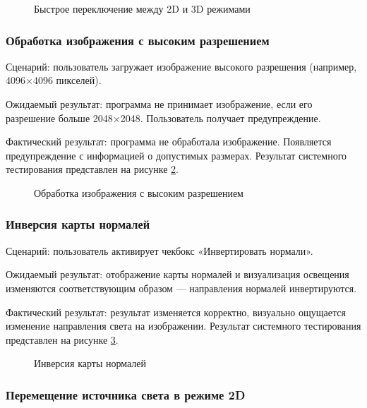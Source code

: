 \begin{figure}[H]
	\caption{Быстрое переключение между 2D и 3D режимами}
	\label{testswap:image}
\end{figure}

\subsubsection{Обработка изображения с высоким разрешением}

Сценарий: пользователь загружает изображение высокого разрешения (например, 4096×4096 пикселей).

Ожидаемый результат: программа не принимает изображение, если его разрешение больше 2048×2048. Пользователь получает предупреждение.

Фактический результат: программа не обработала изображение. Появляется предупреждение с информацией о допустимых размерах.
\newpage
Результат системного тестирования представлен на рисунке \ref{testbig:image}.

\begin{figure}[H]
	\caption{Обработка изображения с высоким разрешением}
	\label{testbig:image}
\end{figure}

\subsubsection{Инверсия карты нормалей}

Сценарий: пользователь активирует чекбокс «Инвертировать нормали».

Ожидаемый результат: отображение карты нормалей и визуализация освещения изменяются соответствующим образом — направления нормалей инвертируются.

Фактический результат: результат изменяется корректно, визуально ощущается изменение направления света на изображении.
\newpage
Результат системного тестирования представлен на рисунке \ref{testinv:image}.

\begin{figure}[H]
	\caption{Инверсия карты нормалей}
	\label{testinv:image}
\end{figure}

\subsubsection{Перемещение источника света в режиме 2D}

